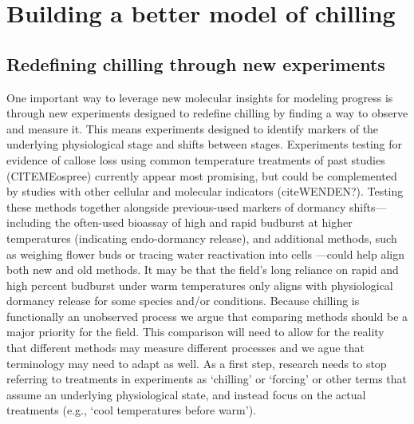 \documentclass[11pt]{article}
\begin{document}
\section*{Building a better model of chilling} %

\subsection*{Redefining chilling through new experiments} 
One important way to leverage new molecular insights for modeling progress is through new experiments designed to redefine chilling by finding a way to observe and measure it. This means experiments  designed to identify markers of the underlying physiological stage and shifts between stages. Experiments testing for evidence of callose loss using common temperature treatments of past studies (CITEMEospree) currently appear most promising, but could be complemented by studies with other cellular and molecular indicators (citeWENDEN?). Testing these methods together alongside previous-used markers of dormancy shifts---including the often-used bioassay of high and rapid budburst at higher temperatures (indicating endo-dormancy release), and additional methods, such as weighing flower buds \citep{chuine2016} or tracing water reactivation into cells \citep{faust1991bound,Kalcsits2009}---could help align both new and old methods. It may be that the field's long reliance on rapid and high percent budburst under warm temperatures only aligns with physiological dormancy release for some species and/or conditions. Because chilling is functionally an unobserved process we argue that comparing methods should be a major priority for the field. This comparison will need to allow for the reality that different methods may measure different processes and we ague that terminology may need to adapt as well. As a first step, research needs to stop referring to treatments in experiments as `chilling' or `forcing' or other terms that assume an underlying physiological state, and instead focus on the actual treatments (e.g., `cool temperatures before warm'). 
\end{document}
